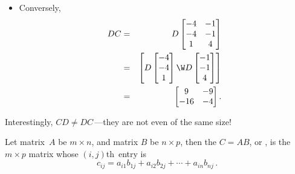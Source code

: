 \begin{example}
\begin{solution}
\begin{itemize}
\item Conversely,
\begin{eqnarray*}
DC&=&D\begin{bmatrix} -4 & -1\\ -4 & -1\\ 1 & 4 \end{bmatrix}
\\&=&\begin{bmatrix}  D\begin{bmatrix} -4\\-4\\1 \end{bmatrix}\W
D\begin{bmatrix} -1\\-1\\4 \end{bmatrix}
\end{bmatrix}
\\&=&\begin{bmatrix} 9&-9\\-16&-4 \end{bmatrix}.
\end{eqnarray*}
\end{itemize}
Interestingly, \(CD\neq DC\)\,---they are not even of the same size!
\end{solution}
\end{example}


\begin{definition} \label{def:matprod}
  Let matrix~\(A\) be \(m\times n\), and matrix \(B\) be \(n\times 
  p\), then the  \(C=AB\), or 
  , is the \(m\times p\) matrix whose \((i,j)\)th~entry is
\begin{equation*}
c_{ij}=a_{i1}b_{1j}+a_{i2}b_{2j}+\cdots+a_{in}b_{nj}\,.
\end{equation*}
\end{definition}

